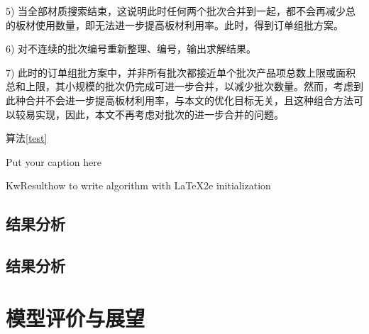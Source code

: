 \documentclass[bwprint]{gmcmthesis}
\begin{document}
5) 当全部材质搜索结束，这说明此时任何两个批次合并到一起，都不会再减少总的板材使用数量，即无法进一步提高板材利用率。此时，得到订单组批方案。

6) 对不连续的批次编号重新整理、编号，输出求解结果。

7) 此时的订单组批方案中，并非所有批次都接近单个批次产品项总数上限或面积总和上限，其小规模的批次仍完成可进一步合并，以减少批次数量。然而，考虑到此种合并不会进一步提高板材利用率，与本文的优化目标无关，且这种组合方法可以较易实现，因此，本文不再考虑对批次的进一步合并的问题。

算法\ref{test}
\begin{algorithm}
    \caption{Put your caption here}\label{test}
    \begin{multicols}{2}
        \SetAlgoLined
        KwResult{how to write algorithm with \LaTeX2e }
        initialization\;
    \end{multicols}
\end{algorithm}

\subsection{结果分析}

\subsection{结果分析}

\section{模型评价与展望}


\newpage
\quad
\newpage





\cite{mittelbach_latex_2004,wright_latex3_2009,beeton_unicode_2008,vieth_experiences_2009}

\newpage
\appendix
\setcounter{page}{1} %
\end{document}
